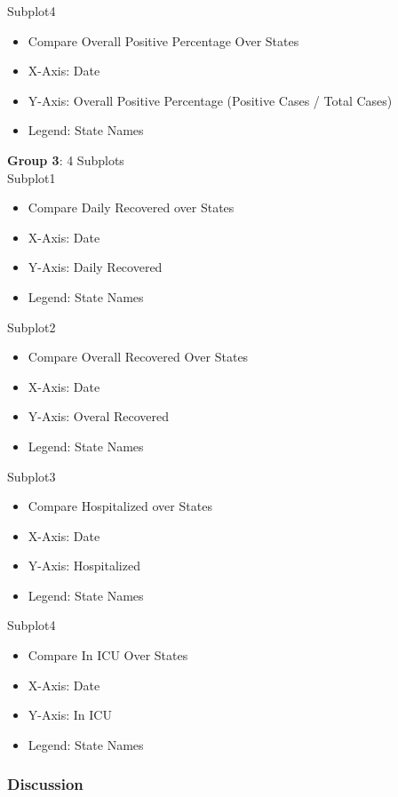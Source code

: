 \documentclass[11pt]{article}
\begin{document}
\noindent
Subplot4
\begin{itemize}
    \item Compare Overall Positive Percentage Over States
    \item X-Axis: Date
    \item Y-Axis: Overall Positive Percentage (Positive Cases / Total Cases)
    \item Legend: State Names
\end{itemize}

\pagebreak

\noindent
\textbf{Group 3}: 4 Subplots \\

\noindent
Subplot1
\begin{itemize}
    \item Compare Daily Recovered over States
    \item X-Axis: Date
    \item Y-Axis: Daily Recovered
    \item Legend: State Names
\end{itemize}

\noindent
Subplot2
\begin{itemize}
    \item Compare Overall Recovered Over States
    \item X-Axis: Date
    \item Y-Axis: Overal Recovered
    \item Legend: State Names
\end{itemize}

\noindent
Subplot3
\begin{itemize}
    \item Compare Hospitalized over States
    \item X-Axis: Date
    \item Y-Axis: Hospitalized
    \item Legend: State Names
\end{itemize}

\noindent
Subplot4
\begin{itemize}
    \item Compare In ICU Over States
    \item X-Axis: Date
    \item Y-Axis: In ICU
    \item Legend: State Names
\end{itemize}

\subsubsection{Discussion}
\end{document}
